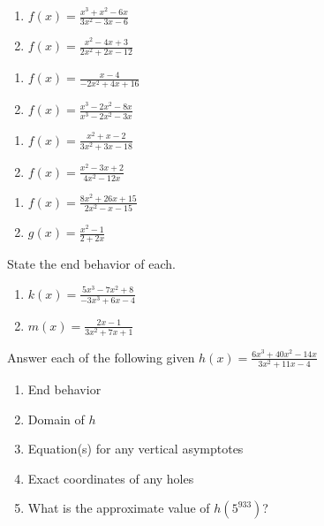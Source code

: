 \begin{multicols}{2}
\begin{enumerate}	\setcounter{enumi}{\value{Review}}
	\item $f(x) = \frac{x^3+x^2-6x}{3x^2-3x-6}$
	\item $f(x) = \frac{x^2-4x+3}{2x^2+2x-12}$
\end{enumerate} \setcounter{Review}{\value{enumi}}
\end{multicols}
\begin{multicols}{2}
\begin{enumerate}	\setcounter{enumi}{\value{Review}}
	\item $f(x) = \frac{x-4}{-2x^2+4x+16}$
	\item $f(x) = \frac{x^3-2x^2-8x}{x^3-2x^2-3x}$
\end{enumerate} \setcounter{Review}{\value{enumi}}
\end{multicols}
\begin{multicols}{2}
\begin{enumerate}	\setcounter{enumi}{\value{Review}}
	\item $f(x) = \frac{x^2+x-2}{3x^2+3x-18}$
	\item $f(x) = \frac{x^2-3x+2}{4x^2-12x}$
\end{enumerate}	\setcounter{Review}{\value{enumi}}
\end{multicols}
\begin{multicols}{2}
\begin{enumerate}	\setcounter{enumi}{\value{Review}}
	\item $f(x) = \frac{8x^2+26x+15}{2x^2-x-15}$
	\item $g(x) = \frac{x^2-1}{2+2x}$
\end{enumerate}	\setcounter{Review}{\value{enumi}}
\end{multicols}
\vspace{0.25in}

State the end behavior of each.
\begin{enumerate}	\setcounter{enumi}{\value{Review}}
	\item $k(x) = \frac{5x^3-7x^2+8}{-3x^3+6x-4}$
	\item $m(x) = \frac{2x-1}{3x^2+7x+1}$
\end{enumerate}	\setcounter{Review}{\value{enumi}}


Answer each of the following given $h(x) = \frac{6x^3+40x^2-14x}{3x^2+11x-4}$
\begin{enumerate}	\setcounter{enumi}{\value{Review}}
	\item End behavior
	\item Domain of $h$
	\item Equation(s) for any vertical asymptotes
	\item Exact coordinates of any holes
	\item What is the approximate value of $h\!\left(5^{933}\right)$?
\end{enumerate}	\setcounter{Review}{\value{enumi}}

